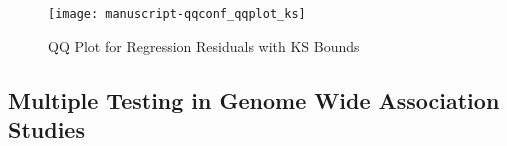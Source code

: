 \documentclass[article]{jss}
\begin{document}
\begin{Schunk}
\end{Schunk}

\begin{figure}
\begin{center}
\texttt{[image: manuscript-qqconf\_qqplot\_ks]}
\end{center}
\caption{QQ Plot for Regression Residuals with KS Bounds}
\end{figure}

\subsection{Multiple Testing in Genome Wide Association Studies}
\end{document}
